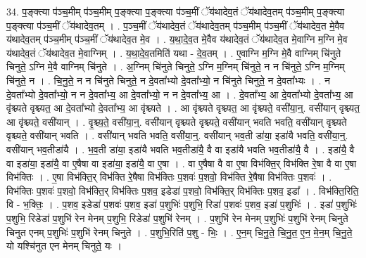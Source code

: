 \documentclass[17pt]{extarticle}
\begin{document}
34. प॒ङ्क्त्या प॑ञ्च॒मीम् प॑ञ्च॒मीम् प॒ङ्क्त्या प॒ङ्क्त्या प॑ञ्च॒मीं ॅय॑थादेव॒तं ॅय॑थादेव॒तम् प॑ञ्च॒मीम् प॒ङ्क्त्या प॒ङ्क्त्या प॑ञ्च॒मीं ॅय॑थादेव॒तम् । . प॒ञ्च॒मीं ॅय॑थादेव॒तं ॅय॑थादेव॒तम् प॑ञ्च॒मीम् प॑ञ्च॒मीं ॅय॑थादेव॒त मे॒वैव य॑थादेव॒तम् प॑ञ्च॒मीम् प॑ञ्च॒मीं ॅय॑थादेव॒त मे॒व । . य॒था॒दे॒व॒त मे॒वैव य॑थादेव॒तं ॅय॑थादेव॒त मे॒वाग्नि म॒ग्नि मे॒व य॑थादेव॒तं ॅय॑थादेव॒त मे॒वाग्निम् । . य॒था॒दे॒व॒तमिति॑ यथा - दे॒व॒तम् । . ए॒वाग्नि म॒ग्नि मे॒वै वाग्निम् चि॑नुते चिनुते॒ ऽग्नि मे॒वै वाग्निम् चि॑नुते । . अ॒ग्निम् चि॑नुते चिनुते॒ ऽग्नि म॒ग्निम् चि॑नुते॒ न न चि॑नुते॒ ऽग्नि म॒ग्निम् चि॑नुते॒ न । . चि॒नु॒ते॒ न न चि॑नुते चिनुते॒ न दे॒वता᳚भ्यो दे॒वता᳚भ्यो॒ न चि॑नुते चिनुते॒ न दे॒वता᳚भ्यः । . न दे॒वता᳚भ्यो दे॒वता᳚भ्यो॒ न न दे॒वता᳚भ्य॒ आ दे॒वता᳚भ्यो॒ न न दे॒वता᳚भ्य॒ आ । . दे॒वता᳚भ्य॒ आ दे॒वता᳚भ्यो दे॒वता᳚भ्य॒ आ वृ॑श्च्यते वृश्च्यत॒ आ दे॒वता᳚भ्यो दे॒वता᳚भ्य॒ आ वृ॑श्च्यते । . आ वृ॑श्च्यते वृश्च्यत॒ आ वृ॑श्च्यते॒ वसी॑या॒न्॒. वसी॑यान् वृश्च्यत॒ आ वृ॑श्च्यते॒ वसी॑यान् । . वृ॒श्च्य॒ते॒ वसी॑या॒न्॒. वसी॑यान् वृश्च्यते वृश्च्यते॒ वसी॑यान् भवति भवति॒ वसी॑यान् वृश्च्यते वृश्च्यते॒ वसी॑यान् भवति । . वसी॑यान् भवति भवति॒ वसी॑या॒न्॒. वसी॑यान् भव॒ती डा॑या॒ इडा॑यै भवति॒ वसी॑या॒न्॒. वसी॑यान् भव॒तीडा॑यै । . भ॒व॒ती डा॑या॒ इडा॑यै भवति भव॒तीडा॑यै॒ वै वा इडा॑यै भवति भव॒तीडा॑यै॒ वै । . इडा॑यै॒ वै वा इडा॑या॒ इडा॑यै॒ वा ए॒षैषा वा इडा॑या॒ इडा॑यै॒ वा ए॒षा । . वा ए॒षैषा वै वा ए॒षा विभ॑क्ति॒र् विभ॑क्ति रे॒षा वै वा ए॒षा विभ॑क्तिः । . ए॒षा विभ॑क्ति॒र् विभ॑क्ति रे॒षैषा विभ॑क्तिः प॒शवः॑ प॒शवो॒ विभ॑क्ति रे॒षैषा विभ॑क्तिः प॒शवः॑ । . विभ॑क्तिः प॒शवः॑ प॒शवो॒ विभ॑क्ति॒र् विभ॑क्तिः प॒शव॒ इडेडा॑ प॒शवो॒ विभ॑क्ति॒र् विभ॑क्तिः प॒शव॒ इडा᳚ । . विभ॑क्ति॒रिति॒ वि - भ॒क्तिः॒ । . प॒शव॒ इडेडा॑ प॒शवः॑ प॒शव॒ इडा॑ प॒शुभिः॑ प॒शुभि॒ रिडा॑ प॒शवः॑ प॒शव॒ इडा॑ प॒शुभिः॑ । . इडा॑ प॒शुभिः॑ प॒शुभि॒ रिडेडा॑ प॒शुभि॑ रेन मेनम् प॒शुभि॒ रिडेडा॑ प॒शुभि॑ रेनम् । . प॒शुभि॑ रेन मेनम् प॒शुभिः॑ प॒शुभि॑ रेनम् चिनुते चिनुत एनम् प॒शुभिः॑ प॒शुभि॑ रेनम् चिनुते । . प॒शुभि॒रिति॑ प॒शु - भिः॒ । . ए॒न॒म् चि॒नु॒ते॒ चि॒नु॒त॒ ए॒न॒ मे॒न॒म् चि॒नु॒ते॒ यो यश्चि॑नुत एन मेनम् चिनुते॒ यः । \newline
\pagebreak
{}
\end{document}
